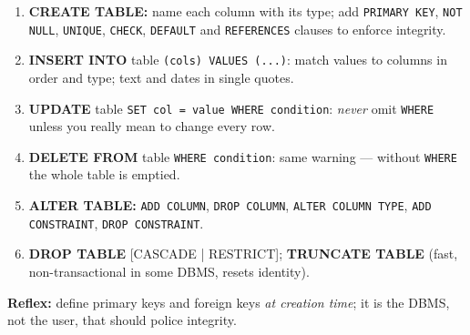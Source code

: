 \documentclass[11pt]{article}
\begin{document}
\begin{methode}
\begin{enumerate}
\item \textbf{CREATE TABLE:} name each column with its type; add \texttt{PRIMARY KEY}, \texttt{NOT NULL}, \texttt{UNIQUE}, \texttt{CHECK}, \texttt{DEFAULT} and \texttt{REFERENCES} clauses to enforce integrity.
\item \textbf{INSERT INTO} table \texttt{(cols) VALUES (...)}: match values to columns in order and type; text and dates in single quotes.
\item \textbf{UPDATE} table \texttt{SET col = value WHERE condition}: \emph{never} omit \texttt{WHERE} unless you really mean to change every row.
\item \textbf{DELETE FROM} table \texttt{WHERE condition}: same warning — without \texttt{WHERE} the whole table is emptied.
\item \textbf{ALTER TABLE:} \texttt{ADD COLUMN}, \texttt{DROP COLUMN}, \texttt{ALTER COLUMN TYPE}, \texttt{ADD CONSTRAINT}, \texttt{DROP CONSTRAINT}.
\item \textbf{DROP TABLE} [CASCADE | RESTRICT]; \textbf{TRUNCATE TABLE} (fast, non-transactional in some DBMS, resets identity).
\end{enumerate}
\textbf{Reflex:} define primary keys and foreign keys \emph{at creation time}; it is the DBMS, not the user, that should police integrity.
\end{methode}
\end{document}

